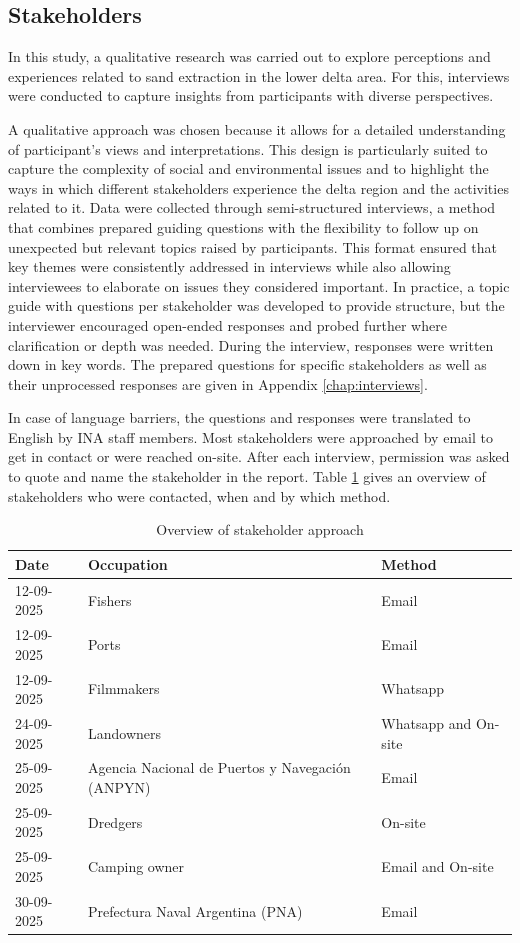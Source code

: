 \subsection{Stakeholders}
\label{sec:stakeholder methods}
In this study, a qualitative research was carried out to explore perceptions and experiences related to sand extraction in the lower delta area. For this, interviews were conducted to capture insights from participants with diverse perspectives.

A qualitative approach was chosen because it allows for a detailed understanding of participant's views and interpretations. This design is particularly suited to capture the complexity of social and environmental issues and to highlight the ways in which different stakeholders experience the delta region and the activities related to it. Data were collected through semi-structured interviews, a method that combines prepared guiding questions with the flexibility to follow up on unexpected but relevant topics raised by participants. This format ensured that key themes were consistently addressed in interviews while also allowing interviewees to elaborate on issues they considered important. In practice, a topic guide with questions per stakeholder was developed to provide structure, but the interviewer encouraged open-ended responses and probed further where clarification or depth was needed. During the interview, responses were written down in key words. The prepared questions for specific stakeholders as well as their unprocessed responses are given in Appendix \ref{chap:interviews}.

In case of language barriers, the questions and responses were translated to English by INA staff members. Most stakeholders were approached by email to get in contact or were reached on-site. After each interview, permission was asked to quote and name the stakeholder in the report. Table \ref{tab:stakeholders} gives an overview of stakeholders who were contacted, when and by which method. 

\begin{table}[H]
    \centering
    \caption{Overview of stakeholder approach}
    \begin{tabularx}{\textwidth}{l l l}
        \toprule
        Date & Occupation & Method \\
        \midrule
        12-09-2025 & Fishers & Email \\
        12-09-2025 & Ports & Email \\
        12-09-2025 & Filmmakers & Whatsapp \\
        24-09-2025 & Landowners & Whatsapp and On-site \\
        25-09-2025 & Agencia Nacional de Puertos y Navegación (ANPYN) &  Email \\
        25-09-2025 & Dredgers & On-site \\
        25-09-2025 & Camping owner & Email and On-site \\
        30-09-2025 & Prefectura Naval Argentina (PNA) & Email \\
        \bottomrule
    \end{tabularx}
    
    \label{tab:stakeholders}
\end{table}

